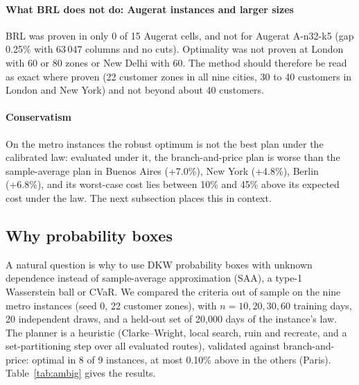 \documentclass[preprint,11pt]{elsarticle}
\theoremstyle{definition}
\theoremstyle{remark}
\begin{document}
\paragraph{What BRL does not do: Augerat instances and larger sizes} BRL was proven in only 0 of 15 Augerat cells, and not for Augerat A-n32-k5 (gap 0.25\% with 63\,047 columns and no cuts). Optimality was not proven at London with 60 or 80 zones or New Delhi with 60. The method should therefore be read as exact where proven (22 customer zones in all nine cities, 30 to 40 customers in London and New York) and not beyond about 40 customers.

\paragraph{Conservatism} On the metro instances the robust optimum is not the best plan under the calibrated law: evaluated under it, the branch-and-price plan is worse than the sample-average plan in Buenos Aires (+7.0\%), New York (+4.8\%), Berlin (+6.8\%), and its worst-case cost lies between 10\% and 45\% above its expected cost under the law. The next subsection places this in context.

\subsection{Why probability boxes}\label{sec:res-pbox}

A natural question is why to use DKW probability boxes with unknown dependence instead of sample-average approximation (SAA), a type-1 Wasserstein ball or CVaR. We compared the criteria out of sample on the nine metro instances (seed 0, 22 customer zones), with $n=10,20,30,60$ training days, 20 independent draws, and a held-out set of 20{,}000 days of the instance's law. The planner is a heuristic (Clarke--Wright, local search, ruin and recreate, and a set-partitioning step over all evaluated routes), validated against branch-and-price: optimal in 8 of 9 instances, at most 0.10\% above in the others (Paris). Table~\ref{tab:ambig} gives the results.
\end{document}
